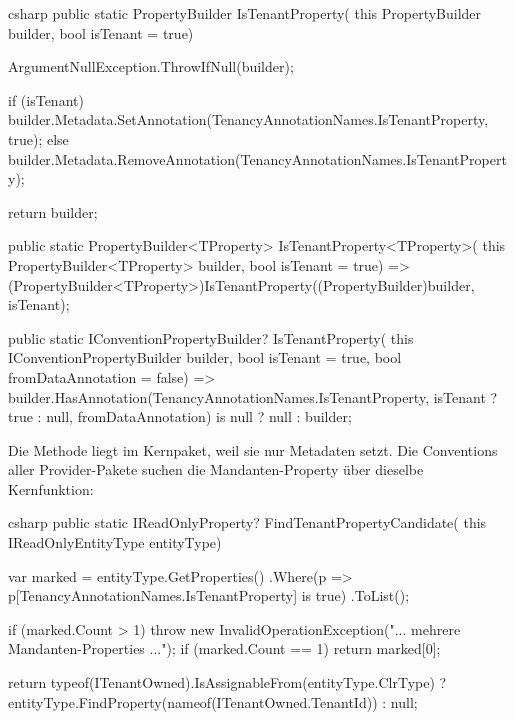 \begin{sourcecode}{csharp}
public static PropertyBuilder IsTenantProperty(
    this PropertyBuilder builder, bool isTenant = true)
{
    ArgumentNullException.ThrowIfNull(builder);

    if (isTenant)
        builder.Metadata.SetAnnotation(TenancyAnnotationNames.IsTenantProperty, true);
    else
        builder.Metadata.RemoveAnnotation(TenancyAnnotationNames.IsTenantProperty);

    return builder;
}

public static PropertyBuilder<TProperty> IsTenantProperty<TProperty>(
    this PropertyBuilder<TProperty> builder, bool isTenant = true)
    => (PropertyBuilder<TProperty>)IsTenantProperty((PropertyBuilder)builder, isTenant);

public static IConventionPropertyBuilder? IsTenantProperty(
    this IConventionPropertyBuilder builder,
    bool isTenant = true,
    bool fromDataAnnotation = false)
    => builder.HasAnnotation(TenancyAnnotationNames.IsTenantProperty,
           isTenant ? true : null, fromDataAnnotation) is null
        ? null
        : builder;
\end{sourcecode}

Die Methode liegt im Kernpaket, weil sie nur Metadaten setzt. Die Conventions aller
Provider-Pakete suchen die Mandanten-Property über dieselbe Kernfunktion:

\begin{sourcecode}{csharp}
public static IReadOnlyProperty? FindTenantPropertyCandidate(
    this IReadOnlyEntityType entityType)
{
    var marked = entityType.GetProperties()
        .Where(p => p[TenancyAnnotationNames.IsTenantProperty] is true)
        .ToList();

    if (marked.Count > 1)
        throw new InvalidOperationException("... mehrere Mandanten-Properties ...");
    if (marked.Count == 1)
        return marked[0];

    return typeof(ITenantOwned).IsAssignableFrom(entityType.ClrType)
        ? entityType.FindProperty(nameof(ITenantOwned.TenantId))
        : null;
}
\end{sourcecode}

